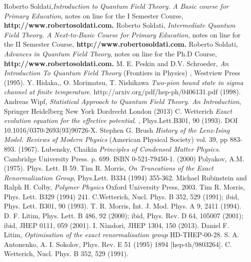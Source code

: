 \textbf{}\begin{thebibliography}{10}

\frenchspacing
{}
Roberto Soldati,\emph{Introduction to Quantum Field Theory. A Basic course for Primary Education}, notes on line for the I Semester Course, \textbf{http://www.robertosoldati.com.}
Roberto Soldati, \emph{Intermediate Quantum Field Theory. A Next-to-Basic Course for Primary Education}, notes on line for the II Semester Course, \textbf{http://www.robertosoldati.com.} 
Roberto Soldati, \emph{Advances in Quantum Field Theory}, notes on line for the Ph.D Course, \textbf{http://www.robertosoldati.com.} 
M. E. Peskin and D.V. Schroeder, \emph{An Introduction To Quantum Field Theory} (Frontiers in Physics) , Westview Press (1995).
Y. Hidaka,, O. Morimatsu, T. Nishikawa \emph{Two-pion bound state in sigma channel at finite temperature}. http://arxiv.org/pdf/hep-ph/0406131.pdf (1998).
Andreas Wipf, \emph{Statistical Approach to Quantum Field Theory. An Introduction}, Springer Heidelberg New York Dordrecht London (2013)
C. Wetterich \emph{Exact evolution equation for the effective potential}. , Phys.Lett.B301, 90 (1993). DOI 10.1016/0370-2693(93)90726-X.
Stephen G. Brush \emph{History of the Lenz-Ising Model. Reviews of Modern Physics} (American Physical Society) vol. 39, pp 883-893. (1967).
Lubensky, Chaikin \emph{Principles of Condensed Matter Physics}. Cambridge University Press. p. 699. ISBN 0-521-79450-1. (2000)
Polyakov, A.M. (1975). Phys. Lett. B 59.
Tim R. Morris, \emph{On Truncations of the Exact Renormalization Group}, Phys.Lett. B334 (1994) 355-362.
Michael Rubinstein and Ralph H. Colby, \emph{Polymer Physics} Oxford University Press, 2003.
Tim R. Morris, Phys. Lett. B329 (1994) 241.
C.Wetterich, Nucl. Phys. B 352, 529 (1991); ibid, Phys. Lett. B301, 90 (1993).
T. R. Morris, Int. J. Mod. Phys. A 9, 2411 (1994).
D. F. Litim, Phys. Lett. B 486, 92 (2000); ibid, Phys. Rev. D 64, 105007 (2001); ibid, JHEP 0111, 059 (2001).
I. N\`andori, JHEP 1304, 150 (2013).
Daniel F. Litim, \emph{Optimisation of the exact renormalisation group} HD-THEP-00-28.
S. A. Antonenko, A. I. Sokolov, Phys. Rev. E 51 (1995) 1894 [hep-th/9803264].
C. Wetterich, Nucl. Phys. B 352, 529 (1991).

\end{thebibliography}

